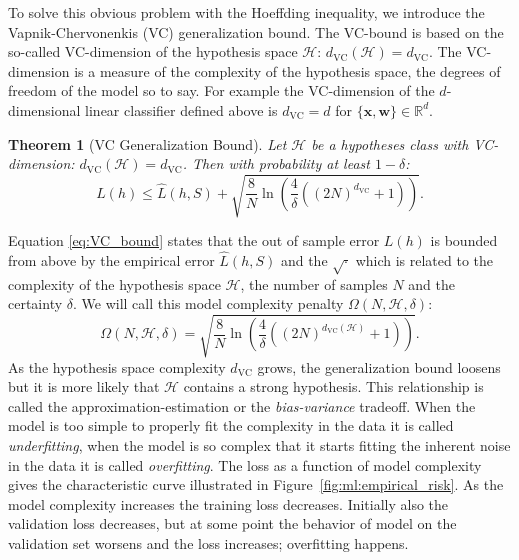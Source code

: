 \documentclass[a4paper, twoside, nobib]{tufte-book}
\newtheorem{theorem}{Theorem}
\renewcommand{\vec}[1]{\mathbf{#1}}
\begin{document}
To solve this obvious problem with the Hoeffding inequality, we introduce the Vapnik-Chervonenkis (VC) generalization bound. The VC-bound is based on the so-called VC-dimension of the hypothesis space $\mathcal{H}$: $d_\mathrm{VC}(\mathcal{H}) = d_\mathrm{VC}$. The VC-dimension is a measure of the complexity of the hypothesis space, the degrees of freedom of the model so to say. For example the VC-dimension of the $d$-dimensional linear classifier defined above is $d_\mathrm{VC}=d$ for $\{\vec{x}, \vec{w}\} \in \mathbb{R}^d$. 
\begin{theorem}[VC Generalization Bound]
  \label{theorem:VC_generalization_bound}
  Let $\mathcal{H}$ be a hypotheses class with VC-dimension: $d_\mathrm{VC}(\mathcal{H}) = d_\mathrm{VC}$. Then with probability at least $1-\delta$: 
  \begin{equation}
    \label{eq:VC_bound}
    L(h) \leq \hat{L}(h, S) + \sqrt{ \frac{8}{N} \ln \left( \frac{4}{\delta} \left( \left(2N \right)^{d_\mathrm{VC}} + 1 \right)  \right)} .
  \end{equation}
\end{theorem}
Equation \eqref{eq:VC_bound} states that the out of sample error $L(h)$ is bounded from above by the empirical error $\hat{L}(h, S)$ and the $\sqrt{ \boldsymbol{\cdot}}$ which is related to the complexity of the hypothesis space $\mathcal{H}$, the number of samples $N$ and the certainty $\delta$. We will call this model complexity penalty $\Omega(N, \mathcal{H}, \delta)$:
\begin{equation}
  \Omega(N, \mathcal{H}, \delta) = \sqrt{ \frac{8}{N} \ln \left( \frac{4}{\delta} \left( \left(2N \right)^{d_\mathrm{VC}(\mathcal{H})} + 1 \right)  \right)}.
\end{equation}
As the hypothesis space complexity $d_\mathrm{VC}$ grows, the generalization bound loosens but it is more likely that $\mathcal{H}$ contains a strong hypothesis. This relationship is called the approximation-estimation or the  \emph{bias-variance} tradeoff. When the model is too simple to properly fit the complexity in the data it is called \emph{underfitting}, when the model is so complex that it starts fitting the inherent noise in the data it is called \emph{overfitting}. The loss as a function of model complexity gives the characteristic curve illustrated in Figure~\ref{fig:ml:empirical_risk}. As the model complexity increases the training loss decreases. Initially also the validation loss decreases, but at some point the behavior of model on the validation set worsens and the loss increases; overfitting happens. 
\end{document}
